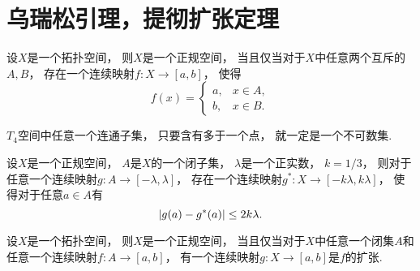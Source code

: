 \section{乌瑞松引理，提彻扩张定理}
\begin{lemma}\label{theorem:扩张定理.乌瑞松引理}
设\(X\)是一个拓扑空间，
则\(X\)是一个正规空间，
当且仅当对于\(X\)中任意两个互斥的\(A,B\)，
存在一个连续映射\(f\colon X \to [a,b]\)，
使得\begin{equation*}
	f(x) = \left\{ \begin{array}{cl}
		a, & x \in A, \\
		b, & x \in B.
	\end{array} \right.
\end{equation*}
\end{lemma}

\begin{theorem}
\(T_4\)空间中任意一个连通子集，
只要含有多于一个点，
就一定是一个不可数集.
\end{theorem}

\begin{lemma}
设\(X\)是一个正规空间，
\(A\)是\(X\)的一个闭子集，
\(\lambda\)是一个正实数，
\(k=1/3\)，
则对于任意一个连续映射\(g\colon A \to [-\lambda,\lambda]\)，
存在一个连续映射\(g^*\colon X \to [-k\lambda,k\lambda]\)，
使得对于任意\(a \in A\)有\begin{equation*}
	\abs{g(a) - g^*(a)} \leq 2k\lambda.
\end{equation*}
\end{lemma}

\begin{theorem}\label{theorem:扩张定理.提彻扩张定理}
设\(X\)是一个拓扑空间，
则\(X\)是一个正规空间，
当且仅当对于\(X\)中任意一个闭集\(A\)和任意一个连续映射\(f\colon A \to [a,b]\)，
有一个连续映射\(g\colon X \to [a,b]\)是\(f\)的扩张.
\end{theorem}
